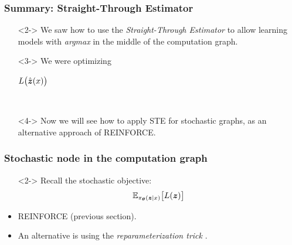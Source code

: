\begin{frame}%
\frametitle{Summary: Straight-Through Estimator}%
\centering
\begin{itemize}
    \item[]<2-> We saw how to use the \textit{Straight-Through Estimator} to allow learning models with \textit{argmax} in the middle of the computation graph.\\
    \item[]<3-> We were optimizing
\parbox{.333\textwidth}{\hfil$L\big(\hat{\boldsymbol{z}}(x)\big)$\hfil}\\

    \item[]<4->
    \smallskip
    Now we will see how to apply STE for stochastic graphs, as an alternative approach of REINFORCE.
\end{itemize}
\end{frame}


\begin{frame}%
\frametitle{Stochastic node in the computation graph}%
\centering
\begin{itemize}
    \item[]<2-> Recall the stochastic objective:
        $$ \mathbb{E}_{\pi_{\boldsymbol{\theta}}(\boldsymbol{z} \mid x)} \big[ L(\boldsymbol{z}) \big] $$
    \item<3-> REINFORCE (previous section).
    \item<5-> An alternative is using the \textit{reparameterization trick} \citep{kingma2013auto}.
\end{itemize}
\end{frame}


